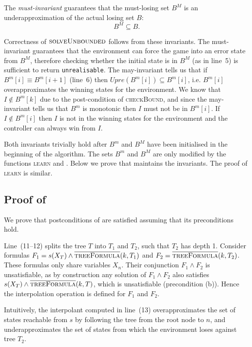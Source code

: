 The \emph{must-invariant} guarantees that the must-losing set $B^M$ is an
underapproximation of the actual losing set $B$: $$B^M \subseteq B.$$

Correctness of $\textsc{solveUnbounded}$ follows from these invariants. The
must-invariant guarantees that the environment can force the game into an error
state from $B^M$, therefore checking whether the initial state is in $B^M$ (as
in line~5) is sufficient to return \texttt{unrealisable}. The may-invariant
tells us that if $B^m[i] \equiv B^m[i+1]$ (line~6) then $Upre(B^m[i]) \subseteq
B^m[i]$, i.e. $B^m[i]$ overapproximates the winning states for the environment.
We know that $I \not\in B^m[k]$ due to the post-condition of
\textsc{checkBound}, and since the may-invariant tells us that $B^m$ is
monotonic then $I$ must not be in $B^m[i]$. If $I \not\in B^m[i]$ then $I$ is
not in the winning states for the environment and the controller can always win
from $I$. 

Both invariants trivially hold after $B^m$ and $B^M$ have been initialised in
the beginning of the algorithm. The sets $B^m$ and $B^M$ are only modified by
the functions \textsc{learn} and .  Below we prove
that  maintains the invariants.  The proof of
\textsc{learn} is similar.

\subsection{Proof of }

We prove that postconditions of \textsc{} are satisfied
assuming that its preconditions hold.

Line~(11--12) splits the tree $T$ into $T_1$ and $T_2$, such that $T_2$ has depth
1.  Consider formulas $F_1=s(X_T) \land
\textsc{$\overline{\mbox{treeFormula}}$}(k, T_1)$ and $F_2 =
\textsc{$\overline{\mbox{treeFormula}}$}(k, T_2)$.  These formulas only share variables
$X_n$.  Their conjunction $F_1 \land F_2$ is unsatisfiable, as by construction
any solution of $F_1 \land F_2$ also satisfies $s(X_T) \land
\textsc{$\overline{\mbox{treeFormula}}$}(k, T)$, which is unsatisfiable (precondition (b)).  Hence the
interpolation operation is defined for $F_1$ and $F_2$.  

Intuitively, the interpolant computed in line~(13) overapproximates the set of
states reachable from $s$ by following the tree from the root node to $n$,
and underapproximates the set of states from which the environment loses
against tree $T_2$.  


